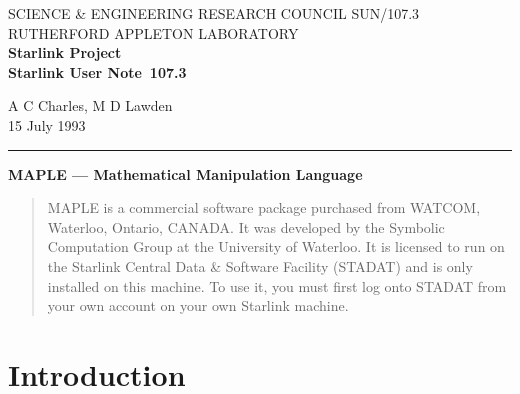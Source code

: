\pagestyle{myheadings}

\newcommand{\stardoccategory}  {Starlink User Note}
\newcommand{\stardocinitials}  {SUN}
\newcommand{\stardocnumber}    {107.3}
\newcommand{\stardocauthors}   {A C Charles, M D Lawden}
\newcommand{\stardocdate}      {15 July 1993}
\newcommand{\stardoctitle}     {MAPLE --- Mathematical Manipulation Language}

\newcommand{\stardocname}{\stardocinitials /\stardocnumber}
\renewcommand{\_}{{\tt\char'137}}     %
\markright{\stardocname}
\setlength{\textwidth}{160mm}
\setlength{\textheight}{230mm}
\setlength{\topmargin}{-2mm}
\setlength{\oddsidemargin}{0mm}
\setlength{\evensidemargin}{0mm}
\setlength{\parindent}{0mm}
\setlength{\parskip}{\medskipamount}
\setlength{\unitlength}{1mm}


\thispagestyle{empty}
SCIENCE \& ENGINEERING RESEARCH COUNCIL \hfill \stardocname\\
RUTHERFORD APPLETON LABORATORY\\
{\large\bf Starlink Project\\}
{\large\bf \stardoccategory\ \stardocnumber}
\begin{flushright}
\stardocauthors\\
\stardocdate
\end{flushright}
\vspace{-4mm}
\rule{\textwidth}{0.5mm}
\vspace{5mm}
\begin{center}
{\Large\bf \stardoctitle}
\end{center}
\vspace{5mm}

\begin{quote}{\em 

MAPLE is a commercial software package purchased from WATCOM, Waterloo,
Ontario, CANADA. It was developed by the Symbolic Computation Group at
the University of Waterloo. It is licensed to run on the Starlink Central
Data \& Software Facility (STADAT) and is only installed on this machine.
To use it, you must first log onto STADAT from your own account on your
own Starlink machine.

}
\end{quote}

\section{Introduction}

